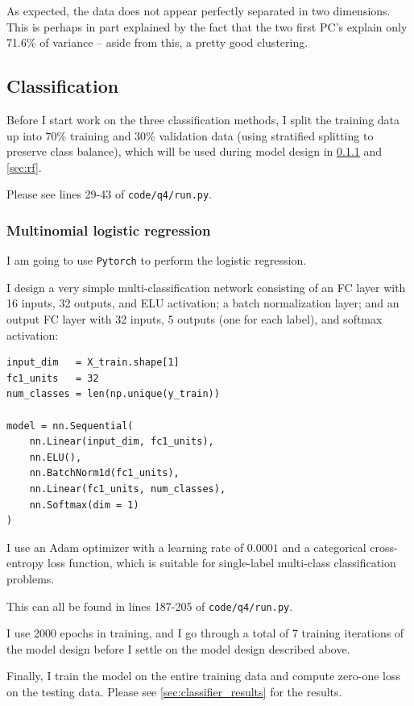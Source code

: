As expected, the data does not appear perfectly separated in two dimensions.
This is perhaps in part explained by the fact that the two first PC's explain
only 71.6\% of variance -- aside from this, a pretty good clustering.

\subsection{Classification}
\label{sec:classification}

Before I start work on the three classification methods, I split the training
data up into 70\% training and 30\% validation data (using stratified splitting
to preserve class balance), which will be used during model design in
\cref{sec:mlr} and \cref{sec:rf}.

Please see lines 29-43 of \texttt{code/q4/run.py}.

\subsubsection{Multinomial logistic regression}
\label{sec:mlr}

I am going to use \texttt{Pytorch} to perform the logistic regression.

I design a very simple multi-classification network consisting of an FC layer
with 16 inputs, 32 outputs, and ELU activation; a batch normalization layer; and
an output FC layer with 32 inputs, 5 outputs (one for each label), and softmax
activation:

\begin{verbatim}
input_dim   = X_train.shape[1]
fc1_units   = 32
num_classes = len(np.unique(y_train))

model = nn.Sequential(
    nn.Linear(input_dim, fc1_units),
    nn.ELU(),
    nn.BatchNorm1d(fc1_units),
    nn.Linear(fc1_units, num_classes),
    nn.Softmax(dim = 1)
)
\end{verbatim}

I use an Adam optimizer with a learning rate of $0.0001$ and a categorical
cross-entropy loss function, which is suitable for single-label multi-class
classification problems.

This can all be found in lines 187-205 of \texttt{code/q4/run.py}.

I use 2000 epochs in training, and I go through a total of 7 training iterations
of the model design before I settle on the model design described above.

Finally, I train the model on the entire training data and compute zero-one loss
on the testing data. Please see \cref{sec:classifier_results} for the results.


